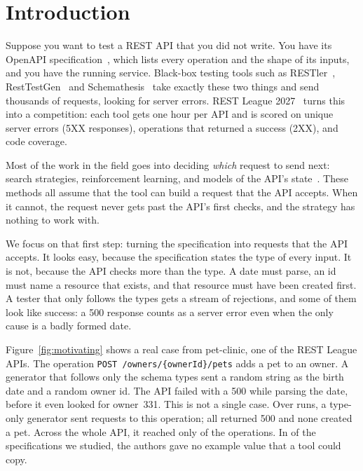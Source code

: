 \section{Introduction}
\label{sec:intro}

Suppose you want to test a REST API that you did not write. You have its
OpenAPI specification~\cite{openapi}, which lists every operation and the
shape of its inputs, and you have the running service. Black-box testing
tools such as RESTler~\cite{restler}, RestTestGen~\cite{resttestgen} and
Schemathesis~\cite{schemathesis} take exactly these two things and send
thousands of requests, looking for server errors. REST League
2027~\cite{restleague} turns this into a competition: each tool gets one
hour per API and is scored on unique server errors (5XX responses),
operations that returned a success (2XX), and code coverage.

Most of the work in the field goes into deciding \emph{which} request to send
next: search strategies, reinforcement learning, and models of the API's
state~\cite{evomaster,arat-rl,morest,deeprest}. These methods all assume that
the tool can build a request that the API accepts. When it cannot, the
request never gets past the API's first checks, and the strategy has nothing
to work with.

We focus on that first step: turning the specification into requests that
the API accepts. It looks easy, because the specification states the type of
every input. It is not, because the API checks more than the type. A date
must parse, an id must name a resource that exists, and that resource must
have been created first. A tester that only follows the types gets a stream
of rejections, and some of them look like success: a 500 response counts as
a server error even when the only cause is a badly formed date.

Figure~\ref{fig:motivating} shows a real case from pet-clinic, one of the
REST League APIs. The operation \texttt{POST /owners/\{ownerId\}/pets} adds a
pet to an owner. A generator that follows only the schema types sent a random
string as the birth date and a random owner id. The API failed with a 500
while parsing the date, before it even looked for owner~331. This is not a
single case. Over \NReps runs, a type-only generator sent
\NMotivBaselineRequests requests to this operation; all
\NMotivBaselineServer returned 500 and none created a pet. Across the whole
API, it reached only \NPetclinicBaselineCov of the operations. In
\NSpecsWithoutExamples of the \NSpecs specifications we studied, the authors
gave no example value that a tool could copy.

